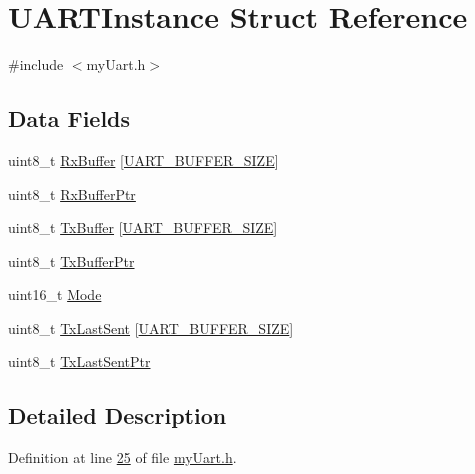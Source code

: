 \hypertarget{struct_u_a_r_t_instance}{\section{U\-A\-R\-T\-Instance Struct Reference}
\label{struct_u_a_r_t_instance}
}


{\ttfamily \#include $<$my\-Uart.\-h$>$}

\subsection*{Data Fields}
\begin{DoxyCompactItemize}
\item 
uint8\-\_\-t \hyperlink{struct_u_a_r_t_instance_a19e526bc57bbb10939b53ea13eee30fa}{Rx\-Buffer} \mbox{[}\hyperlink{my_uart_8h_a0d57378e32bf8278011460740bc29f7f}{U\-A\-R\-T\-\_\-\-B\-U\-F\-F\-E\-R\-\_\-\-S\-I\-Z\-E}\mbox{]}
\item 
uint8\-\_\-t \hyperlink{struct_u_a_r_t_instance_a207dabce7103416b36680d9ecc050684}{Rx\-Buffer\-Ptr}
\item 
uint8\-\_\-t \hyperlink{struct_u_a_r_t_instance_a77d9f6986b01073dd0d2385d2e34f961}{Tx\-Buffer} \mbox{[}\hyperlink{my_uart_8h_a0d57378e32bf8278011460740bc29f7f}{U\-A\-R\-T\-\_\-\-B\-U\-F\-F\-E\-R\-\_\-\-S\-I\-Z\-E}\mbox{]}
\item 
uint8\-\_\-t \hyperlink{struct_u_a_r_t_instance_ada90140ddc0177a452e32c0a1268f0fe}{Tx\-Buffer\-Ptr}
\item 
uint16\-\_\-t \hyperlink{struct_u_a_r_t_instance_a6cdb50e2027bf68b7ad66e2863c1ae29}{Mode}
\item 
uint8\-\_\-t \hyperlink{struct_u_a_r_t_instance_ac79c2c5b8bc7ae929e76b44e9b0d71a8}{Tx\-Last\-Sent} \mbox{[}\hyperlink{my_uart_8h_a0d57378e32bf8278011460740bc29f7f}{U\-A\-R\-T\-\_\-\-B\-U\-F\-F\-E\-R\-\_\-\-S\-I\-Z\-E}\mbox{]}
\item 
uint8\-\_\-t \hyperlink{struct_u_a_r_t_instance_a61c194974dc7b5951c59543ecbf6c651}{Tx\-Last\-Sent\-Ptr}
\end{DoxyCompactItemize}


\subsection{Detailed Description}


Definition at line \hyperlink{my_uart_8h_source_l00025}{25} of file \hyperlink{my_uart_8h_source}{my\-Uart.\-h}.



